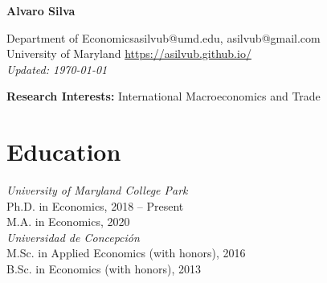\documentclass[11pt]{article}
\begin{document}
\begin{center}
\begin{Large} \bfseries Alvaro Silva\end{Large}
\end{center}


\vspace*{0.2in}
Department of Economics\hfill asilvub@umd.edu, asilvub@gmail.com \\
University of Maryland \hfill \href{https://asilvub.github.io/}{https://asilvub.github.io/} \\
\hfill \emph{Updated: \today}\\

\vspace*{-0.1in}


\textbf{\large Research Interests: } International Macroeconomics and Trade

\section*{Education}
{\itshape University of Maryland College Park}\\
Ph.D. in Economics, 2018 --  Present\\
M.A. in Economics, 2020 \\

{\itshape Universidad de Concepci\'on}\\
M.Sc. in Applied Economics (with honors), 2016 \\
B.Sc. in Economics (with honors), 2013

\end{document}
